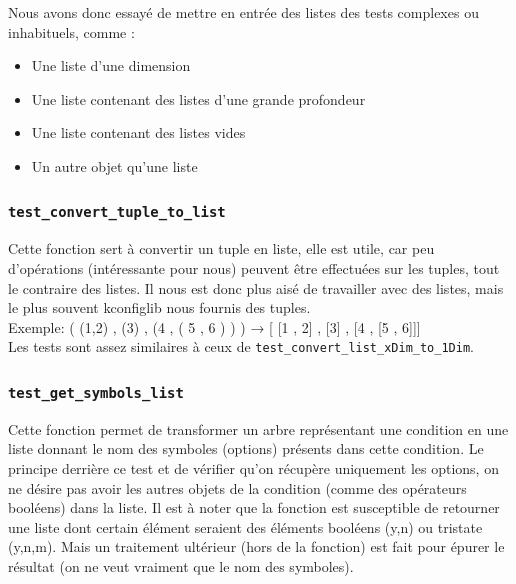 \documentclass[16pts]{report}
\begin{document}
Nous avons donc essayé de mettre en entrée des listes des tests complexes ou 
inhabituels, comme : \\

\begin{itemize}
    \item Une liste d’une dimension
    \item Une liste contenant des listes d'une grande profondeur
    \item Une liste contenant des listes vides
    \item Un autre objet qu'une liste
\end{itemize}

\subsubsection{\texttt{test\_convert\_tuple\_to\_list}}

Cette fonction sert à convertir un tuple en liste, elle est utile, car peu
d'opérations (intéressante pour nous) peuvent être effectuées sur les tuples, tout le contraire des 
listes. Il nous est donc plus aisé de travailler avec des listes, mais le 
plus souvent kconfiglib nous fournis des tuples. \\

Exemple: ( (1,2) , (3) , (4 , ( 5 , 6 ) ) ) → [ [1 , 2] , [3] , [4 , [5 , 6]]] 
\\

Les tests sont assez similaires à ceux de \verb|test_convert_list_xDim_to_1Dim|. \\


\subsubsection{\texttt{test\_get\_symbols\_list}}

Cette fonction permet de transformer un arbre représentant une condition
en une liste donnant le nom des symboles (options) présents dans cette 
condition. Le principe derrière ce test et de vérifier qu'on récupère
uniquement les options, on ne désire pas avoir les autres objets 
de la condition (comme des opérateurs booléens) dans la liste.
Il est à noter que la fonction est susceptible de retourner une liste dont 
certain élément seraient des éléments booléens (y,n) ou tristate (y,n,m). 
Mais un traitement ultérieur (hors de la fonction) est fait pour épurer le résultat (on ne 
veut vraiment que le nom des symboles).\\
\end{document}
